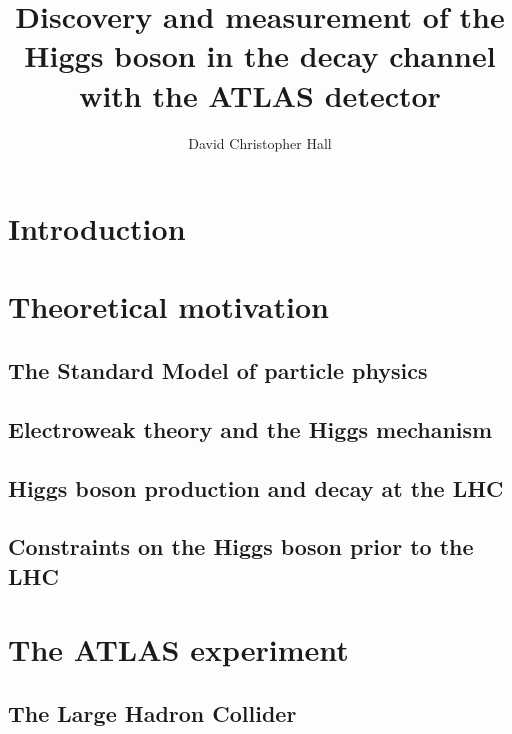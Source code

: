\documentclass[hyper,linkcolor=blue]{mythesis}
\title{Discovery and measurement of the Higgs boson in the \WW decay channel with the ATLAS detector}
\author{David Christopher Hall}
\begin{document}
\begin{frontmatter}
  
\end{frontmatter}

\begin{mainmatter}
  \listoftodos
  
  
  \chapter*{Introduction}
    \label{chap:intro}
    

  \chapter{Theoretical motivation}
    \label{chap:motivation}
    
    \section{The Standard Model of particle physics}
      \label{sec:sm}
      
    \section{Electroweak theory and the Higgs mechanism}
      \label{sec:ewsb}
      
    \section{Higgs boson production and decay at the LHC}
      \label{sec:higgs_phenomenology}
      
    \section{Constraints on the Higgs boson prior to the LHC}
      \label{sec:prior_constraints}
      

  \chapter{The ATLAS experiment}
    \label{chap:experiment}
    
    \section{The Large Hadron Collider}
      \label{sec:lhc}
      

\end{mainmatter}
\end{document}
